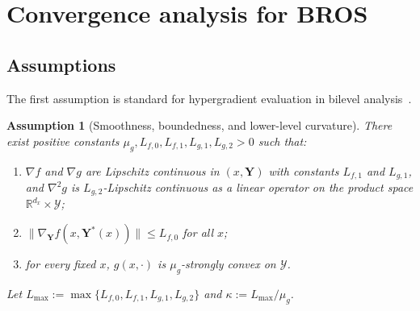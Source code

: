 \documentclass{pkumelon}
\newenvironment{limbox}{\begin{limitationbox}}{\end{limitationbox}}
\theoremstyle{plain}
\newtheorem{assumption}{Assumption}
\newcommand{\oursname}{\textnormal{\textbf{BROS}}}
\newcommand{\ourslast}{\oursname}
\begin{document}
\section{Convergence analysis for \ourslast}
\label{sec:convergence}

\subsection{Assumptions}

The first assumption is standard for hypergradient evaluation in bilevel analysis~\citep{chen2024optimal,chen2023decentralized,kong2025decentralized}.

\begin{limbox}
\begin{assumption}[Smoothness, boundedness, and lower-level curvature]
\label{as:A1}
There exist positive constants $\mu_g,L_{f,0},L_{f,1},L_{g,1},L_{g,2}>0$ such that:
\begin{enumerate}[leftmargin=1.5em,label=\arabic*.,topsep=1pt,itemsep=1pt,parsep=0pt,partopsep=0pt]
    \item $\nabla f$ and $\nabla g$ are Lipschitz continuous in $(x,\boldsymbol Y)$ with constants $L_{f,1}$ and $L_{g,1}$, and $\nabla^2 g$ is $L_{g,2}$-Lipschitz continuous as a linear operator on the product space $\mathbb R^{d_x}\times\mathcal Y$;
    \item $\|\nabla_{\boldsymbol Y} f(x,\boldsymbol Y^*(x))\|\le L_{f,0}$ for all $x$;
    \item for every fixed $x$, $g(x,\cdot)$ is $\mu_g$-strongly convex on $\mathcal Y$.
\end{enumerate}
Let $L_{\max}:=\max\{L_{f,0},L_{f,1},L_{g,1},L_{g,2}\}$ and $\kappa:=L_{\max}/\mu_g$.
\end{assumption}
\end{limbox}
\end{document}
